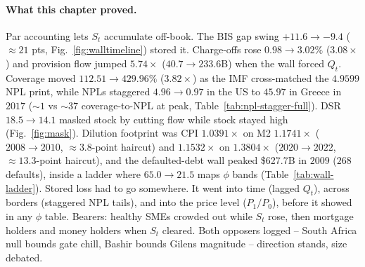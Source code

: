 \paragraph{What this chapter proved.} Par accounting lets $S_t$ accumulate off-book. The BIS gap swing $+11.6\to-9.4$ ($\approx21$ pts, Fig.~\ref{fig:walltimeline}) stored it. Charge-offs rose $0.98\to3.02\%$ ($3.08\times$) and provision flow jumped $5.74\times$ ($40.7\to233.6$B) when the wall forced $Q_t$. Coverage moved $112.51\to429.96\%$ ($3.82\times$) as the IMF cross-matched the $4.9599$ NPL print, while NPLs staggered $4.96\to0.97$ in the US to $45.97$ in Greece in $2017$ ($\sim1$ vs $\sim37$ coverage-to-NPL at peak, Table~\ref{tab:npl-stagger-full}). DSR $18.5\to14.1$ masked stock by cutting flow while stock stayed high (Fig.~\ref{fig:mask}). Dilution footprint was CPI $1.0391\times$ on M2 $1.1741\times$ ($2008\to2010$, $\approx3.8$-point haircut) and $1.1532\times$ on $1.3804\times$ ($2020\to2022$, $\approx13.3$-point haircut), and the defaulted-debt wall peaked \$627.7B in $2009$ ($268$ defaults), inside a ladder where $65.0\to21.5$ maps $\phi$ bands (Table~\ref{tab:wall-ladder}). Stored loss had to go somewhere. It went into time (lagged $Q_t$), across borders (staggered NPL tails), and into the price level ($P_1/P_0$), before it showed in any $\phi$ table. Bearers: healthy SMEs crowded out while $S_t$ rose, then mortgage holders and money holders when $S_t$ cleared. Both opposers logged -- South Africa null bounds gate chill, Bashir bounds Gilens magnitude -- direction stands, size debated.

